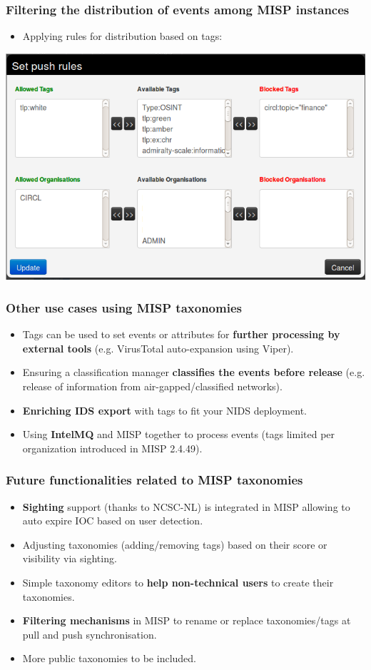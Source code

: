 \begin{frame}
\frametitle{Filtering the distribution of events among MISP instances}
\begin{itemize}
\item Applying rules for distribution based on tags:
\end{itemize}
\includegraphics[scale=0.45]{tagspush.png}
\end{frame}

\begin{frame}
        \frametitle{Other use cases using MISP taxonomies}
\begin{itemize}
    \item Tags can be used to set events or attributes for {\bf further processing by external tools} (e.g. VirusTotal auto-expansion using Viper).
    \item Ensuring a classification manager {\bf classifies the events before release} (e.g. release of information from air-gapped/classified networks).
    \item {\bf Enriching IDS export} with tags to fit your NIDS deployment.
    \item Using {\bf IntelMQ} and MISP together to process events (tags limited per organization introduced in MISP 2.4.49).
\end{itemize}
\end{frame}

\begin{frame}
        \frametitle{Future functionalities related to MISP taxonomies}
\begin{itemize}
    \item {\bf Sighting} support (thanks to NCSC-NL) is integrated in MISP allowing to auto expire IOC based on user detection.
        \item Adjusting taxonomies (adding/removing tags) based on their score or visibility via sighting.
        \item Simple taxonomy editors to {\bf help non-technical users} to create their taxonomies.
        \item {\bf Filtering mechanisms} in MISP to rename or replace taxonomies/tags at pull and push synchronisation.
        \item More public taxonomies to be included.
\end{itemize}
\end{frame}

